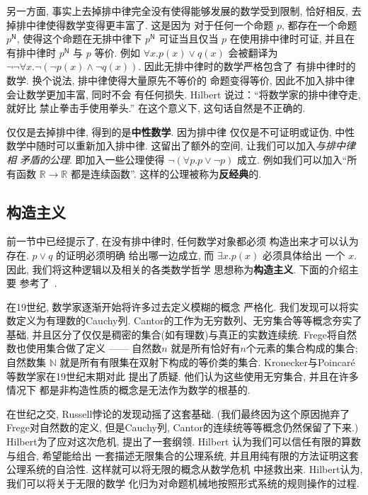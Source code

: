 \documentclass[UTF8]{ctexbook}
\newcommand{\cons}[1]{\textsf{#1}}
\theoremstyle{plain}
\theoremstyle{definition}
\theoremstyle{remark}
\begin{document}
另一方面, 事实上去掉排中律完全没有使得能够发展的数学受到限制,
恰好相反, 去掉排中律使得数学变得更丰富了. 这是因为
对于任何一个命题 \(p\), 都存在一个命题 \(p^{\cons{N}}\),
使得这个命题在无排中律下 \(p^{\cons{N}}\) 可证当且仅当
\(p\) 在使用排中律时可证, 并且在有排中律时 \(p^{\cons{N}}\)
与 \(p\) 等价. 例如 \(\forall x. p(x) \vee q(x)\)
会被翻译为 \(\neg \neg \forall x. \neg (\neg p(x) \wedge \neg q(x))\).
因此无排中律时的数学严格包含了
有排中律时的数学. 换个说法, 排中律使得大量原先不等价的
命题变得等价, 因此不加入排中律会让数学更加丰富, 同时不会
有任何损失. Hilbert 说过：“将数学家的排中律夺走, 就好比
禁止拳击手使用拳头.” 在这个意义下, 这句话自然是不正确的.

仅仅是去掉排中律, 得到的是\textbf{中性数学}. 因为排中律
仅仅是不可证明或证伪, 中性数学中随时可以重新加入排中律.
这留出了额外的空间, 让我们可以加入\emph{与排中律相
矛盾的公理}. 即加入一些公理使得 \(\neg (\forall p. p \vee \neg p)\)
成立. 例如我们可以加入“所有函数 \(\mathbb R \to \mathbb R\)
都是连续函数”. 这样的公理被称为\textbf{反经典}的.

\subsection{构造主义}

前一节中已经提示了, 在没有排中律时, 任何数学对象都必须
构造出来才可以认为存在. \(p \vee q\) 的证明必须明确
给出哪一边成立, 而 \(\exists x. p(x)\) 必须具体给出
一个 \(x\). 因此, 我们将这种逻辑以及相关的各类数学哲学
思想称为\textbf{构造主义}. 下面的介绍主要
参考了~\cites{carl:1998:brouwer}{sep:2022:constructive}.

在19世纪, 数学家逐渐开始将许多过去定义模糊的概念
严格化. 我们发现可以将实数定义为有理数的Cauchy列.
Cantor的工作为无穷数列、无穷集合等等概念夯实了基础,
并且区分了仅仅是稠密的集合(如有理数)与真正的实数连续统.
Frege将自然数也使用集合做了定义 ------ 自然数\(n\)
就是所有恰好有\(n\)个元素的集合构成的集合; 自然数集
\(\mathbb N\) 就是所有有限集在双射下构成的等价类的集合.
Kronecker与Poincar\'e等数学家在19世纪末期对此
提出了质疑. 他们认为这些使用无穷集合, 并且在许多情况下
都是非构造性质的概念是无法作为数学的根基的.

在世纪之交, Russell悖论的发现动摇了这套基础.
(我们最终因为这个原因抛弃了Frege对自然数的定义,
但是Cauchy列, Cantor的连续统等等概念仍然保留了下来.)
Hilbert为了应对这次危机, 提出了一套纲领. Hilbert
认为我们可以信任有限的算数与组合, 希望能给出
一套描述无限集合的公理系统, 并且用纯有限的方法证明这套
公理系统的自洽性. 这样就可以将无限的概念从数学危机
中拯救出来. Hilbert认为, 我们可以将关于无限的数学
化归为对命题机械地按照形式系统的规则操作的过程.
\end{document}
